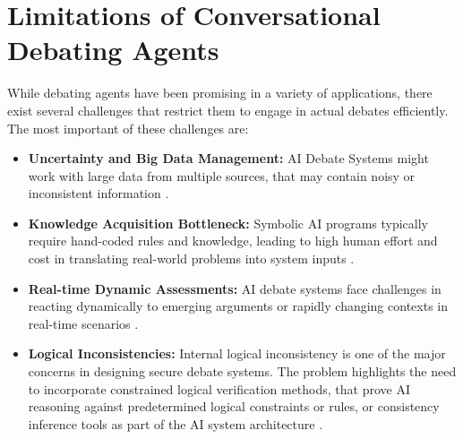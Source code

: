 \documentclass[conference]{IEEEtran}
\begin{document}
\section{Limitations of Conversational Debating Agents}
While debating agents have been promising in a variety of applications, there exist several challenges that restrict them to engage in actual debates efficiently. The most important of these challenges are:
\begin{itemize}
    \item \textbf{Uncertainty and Big Data Management:} AI Debate Systems might work with large data from multiple sources, that may contain noisy or inconsistent information \cite{kasif2024trilogy}.
    
    \item \textbf{Knowledge Acquisition Bottleneck:} Symbolic AI programs typically require hand-coded rules and knowledge, leading to high human effort and cost in translating real-world problems into system inputs \cite{kasif2024trilogy}.
    
    \item \textbf{Real-time Dynamic Assessments:} AI debate systems face challenges in reacting dynamically to emerging arguments or rapidly changing contexts in real-time scenarios \cite{kasif2024trilogy}.
    
    \item \textbf{Logical Inconsistencies:} Internal logical inconsistency is one of the major concerns in designing secure debate systems. The problem highlights the need to incorporate constrained logical verification methods, that prove AI reasoning against predetermined logical constraints or rules, or consistency inference tools as part of the AI system architecture \cite{ilkou2020symbolic}.
\end{itemize}

\newpage
\end{document}
